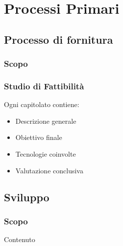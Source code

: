\section{Processi Primari}\label{PP}

    \subsection{Processo di fornitura}\label{PP:Fornitura}	%

        \subsubsection{Scopo}\label{PP:Fornitura:Scopo}


        \subsubsection{Studio di Fattibilità}\label{PP:Fornitura:SdF} 
        	Ogni capitolato contiene:
        	\begin{itemize}
        		\item Descrizione generale
        		\item Obiettivo finale
        		\item Tecnologie coinvolte
        		\item Valutazione conclusiva
        	\end{itemize}


    \subsection{Sviluppo}\label{PP:Sviluppo}

        \subsubsection{Scopo}\label{PP:Sviluppo:Scopo}
        Contenuto



